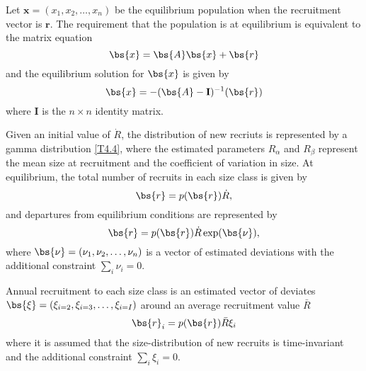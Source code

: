 Let $\boldsymbol{x}=(x_1,x_2,\ldots,x_n)$ be the equilibrium population when the recruitment vector is $\boldsymbol{r}$. The requirement that the population is at equilibrium is equivalent to the matrix equation 
\begin{equation}\label{eq1}
    \bs{x} = \bs{A}\bs{x} + \bs{r}
\end{equation}
and the equilibrium solution for $\bs{x}$ is given by
\begin{equation}\label{eq2}
    \bs{x} =-(\bs{A}-\mathbf{I})^{-1}(\bs{r})
\end{equation}
where $\mathbf{I}$ is the $n \times n$ identity matrix.

Given an initial value of $\dot{R}$, the distribution of new recriuts is represented by a gamma distribution \eqref{T4.4}, where the estimated parameters $R_\alpha$ and $R_\beta$ represent the mean size at recruitment and the coefficient of variation in size.  At equilibrium, the total number of recruits in each size class is given by
\begin{equation}\label{eq3}
    \bs{r} = p(\bs{r})\dot{R},
\end{equation}
and departures from equilibrium conditions are represented by
\begin{equation}\label{eq4}
    \bs{r} = p(\bs{r})\dot{R}\exp(\bs{\nu}),
\end{equation}
where $\bs{\nu}=(\nu_1,\nu_2,\ldots,\nu_n)$ is a vector of estimated deviations with the additional constraint $\sum_i\nu_i = 0$.

Annual recruitment to each size class is an estimated vector of deviates $\bs{\xi}=(\xi_{i=2},\xi_{i=3},\ldots,\xi_{i=I})$ around an average recruitment value $\bar{R}$
\begin{equation}
    \bs{r}_i = p(\bs{r})\bar{R}\xi_i
\end{equation}
where it is assumed that the size-distribution of new recruits is time-invariant and the additional constraint $\sum_i \xi_i = 0$.


